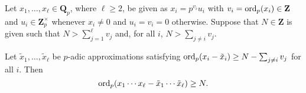 \begin{prop} \label{prop:productval}
Let $x_1, \dotsc, x_{\ell} \in \mathbf{Q}_p$, where $\ell \geq 2$, 
be given as $x_i = p^{v_i} u_i$ with $v_i = \operatorname{ord}_p(x_i) \in \mathbf{Z}$ 
and $u_i \in \mathbf{Z}_p^{\times}$ whenever $x_i \neq 0$ and 
$u_i = v_i = 0$ otherwise.  Suppose that $N \in \mathbf{Z}$ is given 
such that $N > \sum_{j=1}^{\ell} v_j$ and, for all $i$, $N > \sum_{j \neq i} v_j$.

Let $\tilde{x}_1, \dotsc, \tilde{x}_{\ell}$ be $p$-adic approximations 
satisfying $\operatorname{ord}_p(x_i - \tilde{x}_i) \geq N - \sum_{j \neq i} v_j$ 
for all $i$.  Then 
\begin{equation*}
\operatorname{ord}_p(x_1 \dotsm x_{\ell} - \tilde{x}_1 \dotsm \tilde{x}_{\ell}) \geq N.
\end{equation*}
\end{prop}

